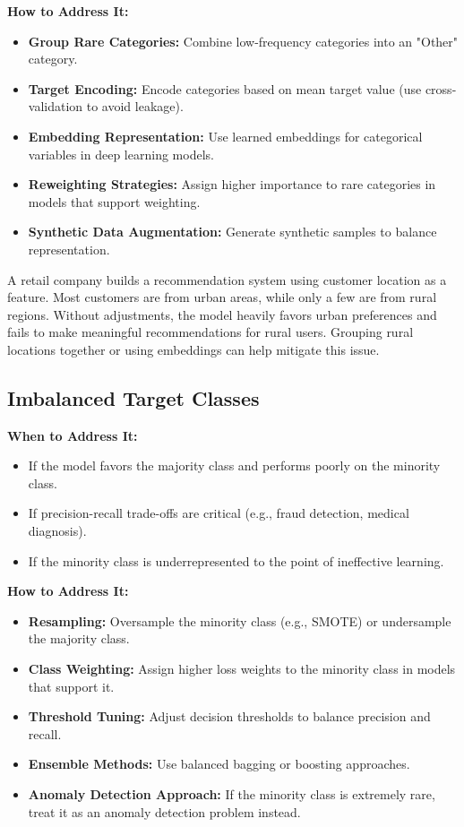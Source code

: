 \documentclass[12pt,openany, draft]{book}
\begin{document}
\textbf{How to Address It:}
\begin{itemize}
    \item \textbf{Group Rare Categories:} Combine low-frequency categories into an "Other" category.
    \item \textbf{Target Encoding:} Encode categories based on mean target value (use cross-validation to avoid leakage).
    \item \textbf{Embedding Representation:} Use learned embeddings for categorical variables in deep learning models.
    \item \textbf{Reweighting Strategies:} Assign higher importance to rare categories in models that support weighting.
    \item \textbf{Synthetic Data Augmentation:} Generate synthetic samples to balance representation.
\end{itemize}

\begin{examplebox}
A retail company builds a recommendation system using customer location as a feature. Most customers are from urban areas, while only a few are from rural regions. Without adjustments, the model heavily favors urban preferences and fails to make meaningful recommendations for rural users. Grouping rural locations together or using embeddings can help mitigate this issue.
\end{examplebox}

\subsection{Imbalanced Target Classes}

\textbf{When to Address It:}
\begin{itemize}
    \item If the model favors the majority class and performs poorly on the minority class.
    \item If precision-recall trade-offs are critical (e.g., fraud detection, medical diagnosis).
    \item If the minority class is underrepresented to the point of ineffective learning.
\end{itemize}

\textbf{How to Address It:}
\begin{itemize}
    \item \textbf{Resampling:} Oversample the minority class (e.g., SMOTE) or undersample the majority class.
    \item \textbf{Class Weighting:} Assign higher loss weights to the minority class in models that support it.
    \item \textbf{Threshold Tuning:} Adjust decision thresholds to balance precision and recall.
    \item \textbf{Ensemble Methods:} Use balanced bagging or boosting approaches.
    \item \textbf{Anomaly Detection Approach:} If the minority class is extremely rare, treat it as an anomaly detection problem instead.
\end{itemize}
\end{document}
